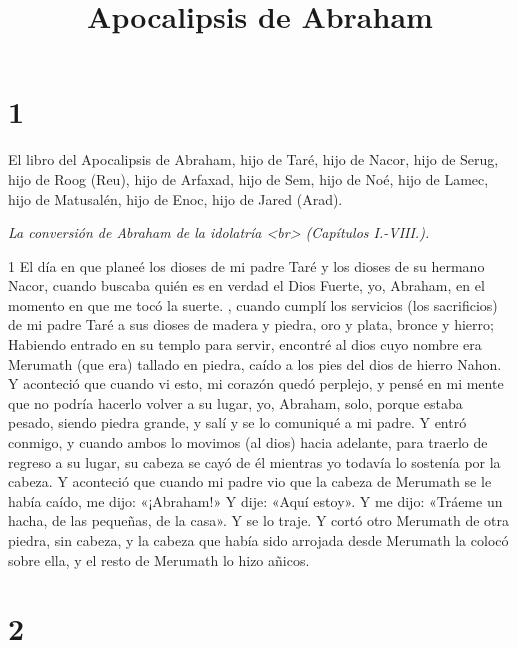 

\title{Apocalipsis de Abraham}

\chapter{1}

\par El libro del Apocalipsis de Abraham, hijo de Taré, hijo de Nacor, hijo de Serug, hijo de Roog (Reu), hijo de Arfaxad, hijo de Sem, hijo de Noé, hijo de Lamec, hijo de Matusalén, hijo de Enoc, hijo de Jared (Arad).

\par \textit{La conversión de Abraham de la idolatría <br> (Capítulos I.-VIII.).}

\par 1 El día en que planeé los dioses de mi padre Taré y los dioses de su hermano Nacor, cuando buscaba quién es en verdad el Dios Fuerte, yo, Abraham, en el momento en que me tocó la suerte. , cuando cumplí los servicios (los sacrificios) de mi padre Taré a sus dioses de madera y piedra, oro y plata, bronce y hierro; Habiendo entrado en su templo para servir, encontré al dios cuyo nombre era Merumath (que era) tallado en piedra, caído a los pies del dios de hierro Nahon. Y aconteció que cuando vi esto, mi corazón quedó perplejo, y pensé en mi mente que no podría hacerlo volver a su lugar, yo, Abraham, solo, porque estaba pesado, siendo piedra grande, y salí y se lo comuniqué a mi padre. Y entró conmigo, y cuando ambos lo movimos (al dios) hacia adelante, para traerlo de regreso a su lugar, su cabeza se cayó de él mientras yo todavía lo sostenía por la cabeza. Y aconteció que cuando mi padre vio que la cabeza de Merumath se le había caído, me dijo: «¡Abraham!» Y dije: «Aquí estoy». Y me dijo: «Tráeme un hacha, de las pequeñas, de la casa». Y se lo traje. Y cortó otro Merumath de otra piedra, sin cabeza, y la cabeza que había sido arrojada desde Merumath la colocó sobre ella, y el resto de Merumath lo hizo añicos.

\chapter{2}

